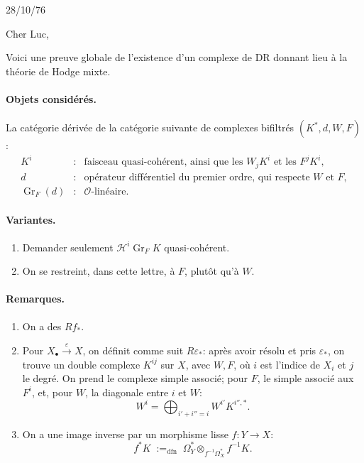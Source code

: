 \documentclass[11pt]{article}
\newcommand{\DR}{\mathrm{DR}}
\newcommand{\Gr}{\operatorname{Gr}}
\newcommand{\HH}{\mathcal H}
\begin{document}
\begin{flushright}
28/10/76
\end{flushright}

Cher Luc,

Voici une preuve globale de l'existence d'un complexe de \(\DR\) donnant lieu à la théorie de Hodge mixte.

\paragraph{Objets considérés.}
La catégorie dérivée de la catégorie suivante de complexes bifiltrés \((K^\ast,d,W,F)\):
\[
\begin{array}{rcl}
K^i &:& \text{faisceau quasi-cohérent, ainsi que les } W_jK^i \text{ et les } F^jK^i,\\
d &:& \text{opérateur différentiel du premier ordre, qui respecte } W \text{ et } F,\\
\Gr_F(d) &:& \mathcal O\text{-linéaire.}
\end{array}
\]

\paragraph{Variantes.}
\begin{enumerate}[label=\alph*)]
\item Demander seulement \(\HH^i\Gr_F K\) quasi-cohérent.
\item On se restreint, dans cette lettre, à \(F\), plutôt qu'à \(W\).
\end{enumerate}

\paragraph{Remarques.}
\begin{enumerate}[label=\alph*)]
\item On a des \(Rf_\ast\).

\item Pour \(X_\bullet \xrightarrow{\varepsilon} X\), on définit comme suit \(R\varepsilon_\ast\): après avoir résolu et pris \(\varepsilon_\ast\), on trouve un double complexe \(K^{ij}\) sur \(X\), avec \(W,F\), où \(i\) est l'indice de \(X_i\) et \(j\) le degré. On prend le complexe simple associé; pour \(F\), le simple associé aux \(F^i\), et, pour \(W\), la diagonale entre \(i\) et \(W\):
\[
  W^i=\bigoplus_{i'+i''=i} W^{i'}K^{i'',\ast}.
\]

\item On a une image inverse par un morphisme lisse \(f:Y\to X\):
\[
  f^\ast K\; {:=}_{\mathrm{dfn}}\; \Omega_Y^\ast\otimes_{f^{-1}\Omega_X^\ast} f^{-1}K.
\]
\end{enumerate}
\end{document}

